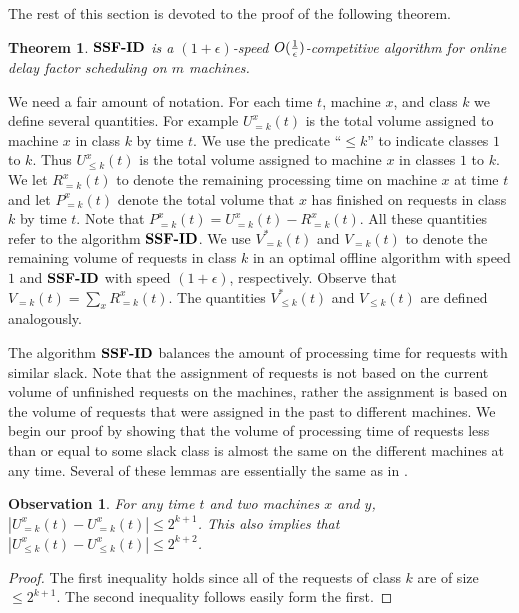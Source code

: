 \documentclass[11pt]{article}
\newtheorem{theorem}[lemma]{Theorem}
\newtheorem{observation}{Observation}
\newcommand{\eps}{\epsilon}
\begin{document}
The rest of this section is devoted to the proof of the following
theorem.
\begin{theorem}
\label{thm:multiple}
${\texttt{\bf{SSF-ID}}}$ is a $(1+ \eps)$-speed $O({1 \over
\eps})$-competitive algorithm for online delay factor
scheduling on $m$ machines.
\end{theorem}

We need a fair amount of notation. For each time $t$, machine $x$, and
class $k$ we define several quantities. For example $U^x_{=k}(t)$ is
the total volume assigned to machine $x$ in class $k$ by time $t$. We
use the predicate ``$\le k$'' to indicate classes $1$ to $k$.  Thus $U^x_{\le
  k}(t)$ is the total volume assigned to machine $x$ in classes $1$ to
$k$. We let $R^x_{=k}(t)$ to denote the remaining processing time on
machine $x$ at time $t$ and let $P^x_{=k}(t)$ denote the total volume
that $x$ has finished on requests in class $k$ by time $t$. Note that
$P^x_{=k}(t) = U^x_{=k}(t) - R^x_{=k}(t)$. All these quantities refer
to the algorithm ${\texttt{\bf{SSF-ID}}}$. We use $V^*_{=k}(t)$ and $V_{=k}(t)$ to
denote the remaining volume of requests in class $k$ in an optimal
offline algorithm with speed $1$ and ${\texttt{\bf{SSF-ID}}}$ with speed $(1+\eps)$,
respectively. Observe that $V_{=k}(t) = \sum_x R^x_{=k}(t)$.  The
quantities $V^*_{\le k}(t)$ and $V_{\le k}(t)$ are defined
analogously.

The algorithm ${\texttt{\bf{SSF-ID}}}$ balances the amount of processing time for
requests with similar slack.  Note that the assignment of requests
is not based on the current volume of unfinished requests on the
machines, rather the assignment is based on the volume of requests
that were assigned in the past to different machines.  We begin
our proof by showing that the volume of processing time of
requests less than or equal to some slack class is almost
the same on the different machines at any time. Several of these
lemmas are essentially the same as in \cite{AvrahamiA03}.

\begin{observation}
\label{observation} For any time $t$ and two machines $x$ and $y$,
$|U^{x}_{=k}(t) - U^{x}_{=k}(t)| \leq 2^{k+1}$.  This also implies that
$|U^{x}_{\leq k}(t) - U^{x}_{\leq k}(t)| \leq 2^{k+2}$.
\end{observation}
\begin{proof}
  The first inequality holds since all of the requests of class $k$
  are of size $\leq 2^{k+1}$.  The second inequality follows easily
  form the first.
\end{proof}
\end{document}
